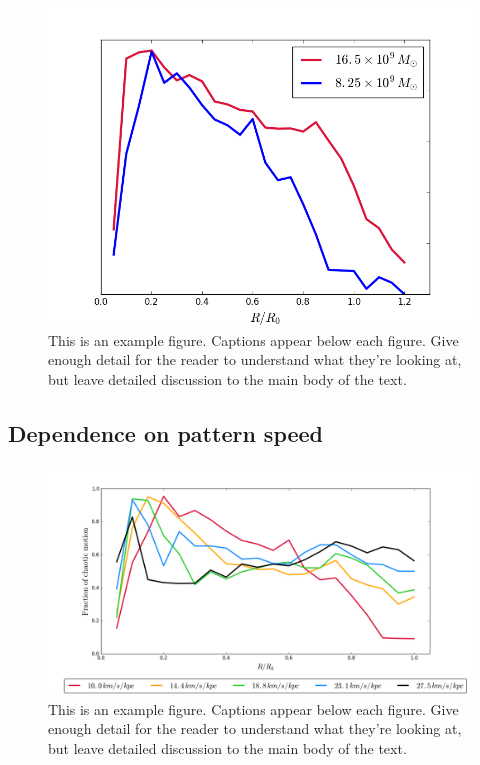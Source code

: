 \documentclass[a4paper,fleqn,usenatbib]{mnras}
\begin{document}
\begin{figure}
	\includegraphics[width=\columnwidth]{hq_plot}
	\caption{This is an example figure. Captions appear below each figure.
		Give enough detail for the reader to understand what they're looking at,
		but leave detailed discussion to the main body of the text.}
	\label{fig:total_mass}
\end{figure}

\subsection{Dependence on pattern speed}


\begin{figure}
	\includegraphics[width=\columnwidth]{all2}
	\caption{This is an example figure. Captions appear below each figure.
		Give enough detail for the reader to understand what they're looking at,
		but leave detailed discussion to the main body of the text.}
	\label{fig:pattern_speed}
\end{figure}
\end{document}
